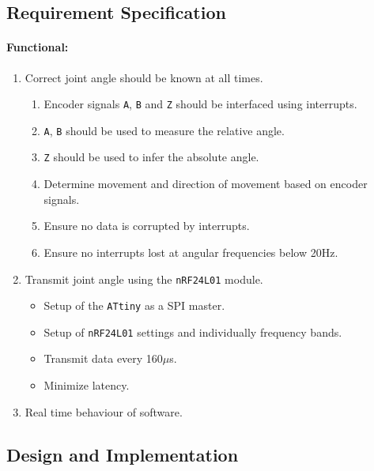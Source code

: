 \subsection{Requirement Specification} 

\paragraph{Functional:}
\begin{enumerate}[resume]
	\item Correct joint angle should be known at all times.
	\label{enum:joint_correct_angles}
	\begin{enumerate}
		\item Encoder signals \texttt{A}, \texttt{B} and \texttt{Z} should be interfaced using interrupts.
		\item \texttt{A}, \texttt{B} should be used to measure the relative angle.
		\item \texttt{Z} should be used to infer the absolute angle. 
		\item Determine movement and direction of movement based on encoder signals.
		\item Ensure no data is corrupted by interrupts.
		\item Ensure no interrupts lost at angular frequencies below 20Hz.
	\end{enumerate}
	\item Transmit joint angle using the \texttt{nRF24L01} module.
	\label{enum:joint_transmit}
	\begin{itemize}
		\item Setup of the \texttt{ATtiny} as a SPI master.
		\item Setup of \texttt{nRF24L01} settings and individually frequency bands.
		\item Transmit data every 160$\mu$s.
		\item Minimize latency.
	\end{itemize}
	\item Real time behaviour of software.
	\label{enum:joint_real_time}
\end{enumerate}

\subsection{Design and Implementation} %
\label{sub:design_and_implementation}

